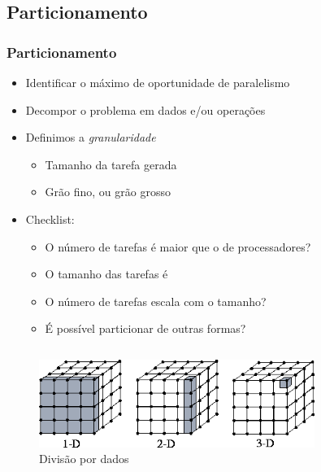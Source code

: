 \documentclass[xcolor={usenames,dvipsnames},12pt,presentation,aspectratio=169]{beamer}
\begin{document}
\subsection{Particionamento}
\begin{frame}
  \frametitle{Particionamento}
  \vspace{-2mm}
  \begin{itemize}
    \item Identificar o máximo de oportunidade de paralelismo
    \item Decompor o problema em dados e/ou operações
    \item Definimos a \emph{granularidade}
      \begin{itemize}
        \item Tamanho da tarefa gerada
        \item Grão fino, ou grão grosso
      \end{itemize}
    \item Checklist:
      \begin{itemize}
        \item O número de tarefas é maior que o de processadores?
        \item O tamanho das tarefas é 
        \item O número de tarefas escala com o tamanho?
        \item É possível particionar de outras formas?
      \end{itemize}
  \end{itemize}
  \vspace{-5mm}
   \begin{columns}
     \begin{column}{0.6\textwidth}
        \begin{center}
          \begin{figure}
        \includegraphics[width=0.8\textwidth]{cubos.png}
            \caption{Divisão por dados}
          \end{figure}

\end{center}
\end{column}
\end{columns}
\end{frame}
\end{document}
